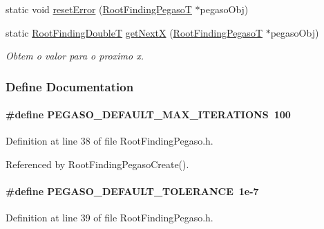 \begin{CompactItemize}
static void \hyperlink{group____pegaso_g0496f8f88be7280598d9cce2a1e622f0}{resetError} (\hyperlink{structRootFindingPegaso}{RootFindingPegasoT} $\ast$pegasoObj)
\item 
static \hyperlink{RootFindingCommon_8h_a296fe63994e03408c4ad62794d472e9}{RootFindingDoubleT} \hyperlink{group____pegaso_gc404fd69441e2b99f44b18fe14d4fc48}{getNextX} (\hyperlink{structRootFindingPegaso}{RootFindingPegasoT} $\ast$pegasoObj)
\begin{CompactList}\small\item\em Obtem o valor para o proximo x. \item\end{CompactList}\end{CompactItemize}


\subsubsection{Define Documentation}
\hypertarget{group____pegaso_gd5756b72d3091ff42470aa73e96b70df}{
\paragraph[PEGASO\_\-DEFAULT\_\-MAX\_\-ITERATIONS]{\setlength{\rightskip}{0pt plus 5cm}\#define PEGASO\_\-DEFAULT\_\-MAX\_\-ITERATIONS~100}\hfill}
\label{group____pegaso_gd5756b72d3091ff42470aa73e96b70df}




Definition at line 38 of file RootFindingPegaso.h.

Referenced by RootFindingPegasoCreate().\hypertarget{group____pegaso_gfb0e1657b5a35c9f071c5bd67a29263d}{
\paragraph[PEGASO\_\-DEFAULT\_\-TOLERANCE]{\setlength{\rightskip}{0pt plus 5cm}\#define PEGASO\_\-DEFAULT\_\-TOLERANCE~1e-7}\hfill}
\label{group____pegaso_gfb0e1657b5a35c9f071c5bd67a29263d}




Definition at line 39 of file RootFindingPegaso.h.


